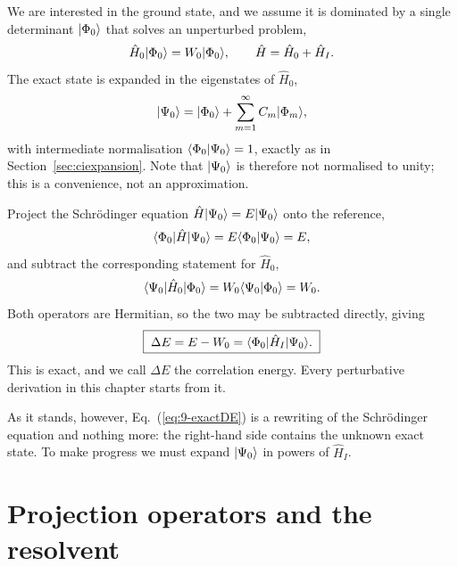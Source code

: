 We are interested in the ground state, and we assume it is dominated by a
single determinant $\vert \Phi_0 \rangle$ that solves an unperturbed problem,
\begin{equation}
  \hat{H}_0\vert \Phi_0 \rangle = W_0\vert \Phi_0 \rangle,
  \qquad
  \hat{H} = \hat{H}_0 + \hat{H}_I .
  \label{eq:9-partition}
\end{equation}
The exact state is expanded in the eigenstates of $\hat{H}_0$,
\begin{equation}
  \vert \Psi_0 \rangle = \vert \Phi_0 \rangle
    + \sum_{m=1}^{\infty}C_m\vert \Phi_m \rangle,
  \label{eq:9-expansion}
\end{equation}
with intermediate normalisation $\langle \Phi_0 \vert \Psi_0 \rangle=1$, exactly as in
Section~\ref{sec:ciexpansion}.  Note that $\vert \Psi_0 \rangle$ is therefore not
normalised to unity; this is a convenience, not an approximation.

Project the Schr\"odinger equation $\hat{H}\vert \Psi_0 \rangle=E\vert \Psi_0 \rangle$ onto
the reference,
\begin{equation}
  \langle \Phi_0 | \hat{H} | \Psi_0 \rangle = E\langle \Phi_0 \vert \Psi_0 \rangle = E,
  \label{eq:9-projectE}
\end{equation}
and subtract the corresponding statement for $\hat{H}_0$,
\begin{equation}
  \langle \Psi_0 | \hat{H}_0 | \Phi_0 \rangle
   = W_0\langle \Psi_0 \vert \Phi_0 \rangle = W_0 .
  \label{eq:9-projectW}
\end{equation}
Both operators are Hermitian, so the two may be subtracted directly, giving
\begin{equation}
  \boxed{\;
  \Delta E = E - W_0
   = \langle \Phi_0 | \hat{H}_I | \Psi_0 \rangle .
  \;}
  \label{eq:9-exactDE}
\end{equation}
This is exact, and we call $\Delta E$ the correlation energy.  Every
perturbative derivation in this chapter starts from it.

As it stands, however, Eq.~(\ref{eq:9-exactDE}) is a rewriting of the
Schr\"odinger equation and nothing more: the right-hand side contains the
unknown exact state.  To make progress we must expand $\vert \Psi_0 \rangle$ in
powers of $\hat{H}_I$.

\section{Projection operators and the resolvent}
\label{sec:projection}

